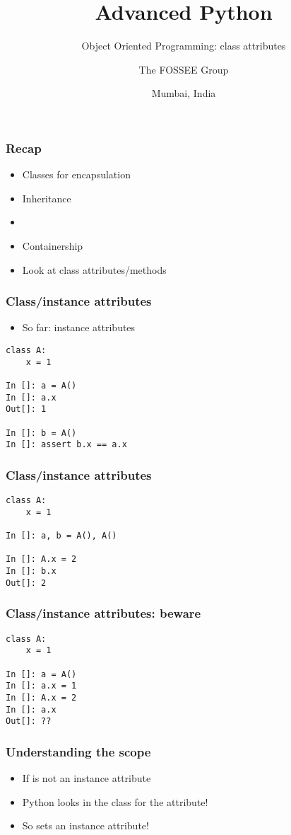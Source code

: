 \documentclass[14pt,compress,aspectratio=169]{beamer}
\title[OOP: Class Attributes]{Advanced Python}
\subtitle{Object Oriented Programming: class attributes}
\author[FOSSEE] {The FOSSEE Group}
\institute[IIT Bombay] {Department of Aerospace Engineering\\IIT Bombay}
\date[] {Mumbai, India}
\begin{document}
\begin{frame}
  \titlepage
\end{frame}

\begin{frame}
  \frametitle{Recap}
  \begin{itemize}
  \item Classes for encapsulation
  \item Inheritance
  \item {}
  \item Containership
    \vspace*{0.3in}
  \item Look at class attributes/methods
  \end{itemize}
\end{frame}


\begin{frame}[fragile]
  \frametitle{Class/instance attributes}
  \begin{itemize}
  \item So far: instance attributes
  \end{itemize}
\begin{lstlisting}
class A:
    x = 1

In []: a = A()
In []: a.x
Out[]: 1

In []: b = A()
In []: assert b.x == a.x
\end{lstlisting}
\end{frame}

\begin{frame}[fragile]
  \frametitle{Class/instance attributes}
\begin{lstlisting}
class A:
    x = 1

In []: a, b = A(), A()

In []: A.x = 2
In []: b.x
Out[]: 2
\end{lstlisting}
\end{frame}

\begin{frame}[fragile]
  \frametitle{Class/instance attributes: beware}
\begin{lstlisting}
class A:
    x = 1

In []: a = A()
In []: a.x = 1
In []: A.x = 2
In []: a.x
Out[]: ??
\end{lstlisting}
\end{frame}

\begin{frame}
  \frametitle{Understanding the scope}
  \begin{itemize}
  \item If  is not an instance attribute
  \item Python looks in the class for the attribute!
    \pause
    \vspace*{0.25in}
  \item So  sets an instance attribute!
  \end{itemize}
\end{frame}
\end{document}
